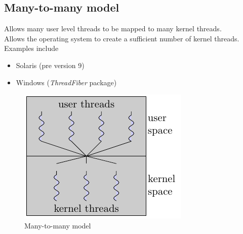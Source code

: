 \documentclass[oneside]{book}
\begin{document}
            \subsection{Many-to-many model}
                Allows many user level threads to be mapped to many kernel threads.\\
                Allows the operating system to create a sufficient number of kernel threads.\\
                Examples include
                \begin{itemize}
                    \item Solaris (pre version 9)
                    \item Windows (\textit{ThreadFiber} package)
                \end{itemize}
                \begin{figure}[H]
                    \centering
                    \includegraphics{figures/many_to_many.pdf}
                    \caption{Many-to-many model}
                \end{figure}
\end{document}
